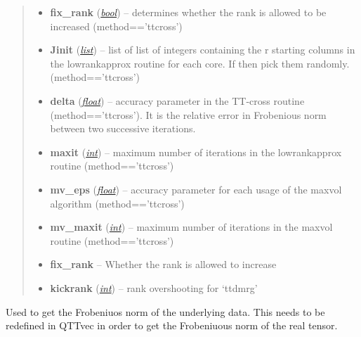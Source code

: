 \documentclass[a4paper,10pt,english]{sphinxmanual}
\begin{document}
\begin{fulllineitems}
\begin{fulllineitems}
\begin{quote}
\begin{description}
\begin{itemize}
\item {} 
\textbf{fix\_rank} (\href{http://docs.python.org/library/functions.html\#bool}{\emph{bool}}) -- determines whether the rank is allowed to be increased (method=='ttcross')

\item {} 
\textbf{Jinit} (\href{http://docs.python.org/library/functions.html\#list}{\emph{list}}) -- list of list of integers containing the r starting columns in the lowrankapprox routine for each core. If  then pick them randomly. (method=='ttcross')

\item {} 
\textbf{delta} (\href{http://docs.python.org/library/functions.html\#float}{\emph{float}}) -- accuracy parameter in the TT-cross routine (method=='ttcross'). It is the relative error in Frobenious norm between two successive iterations.

\item {} 
\textbf{maxit} (\href{http://docs.python.org/library/functions.html\#int}{\emph{int}}) -- maximum number of iterations in the lowrankapprox routine (method=='ttcross')

\item {} 
\textbf{mv\_eps} (\href{http://docs.python.org/library/functions.html\#float}{\emph{float}}) -- accuracy parameter for each usage of the maxvol algorithm (method=='ttcross')

\item {} 
\textbf{mv\_maxit} (\href{http://docs.python.org/library/functions.html\#int}{\emph{int}}) -- maximum number of iterations in the maxvol routine (method=='ttcross')

\item {} 
\textbf{fix\_rank} -- Whether the rank is allowed to increase

\item {} 
\textbf{kickrank} (\href{http://docs.python.org/library/functions.html\#int}{\emph{int}}) -- rank overshooting for `ttdmrg'

\end{itemize}

\end{description}\end{quote}

\end{fulllineitems}


\begin{fulllineitems}
\label{api-ttvec:TensorToolbox.core.TTvec.get_data_F_norm}
Used to get the Frobeniuos norm of the underlying data.
This needs to be redefined in QTTvec in order to get the Frobeniuous norm of the real tensor.


\end{fulllineitems}
\end{fulllineitems}
\end{document}
